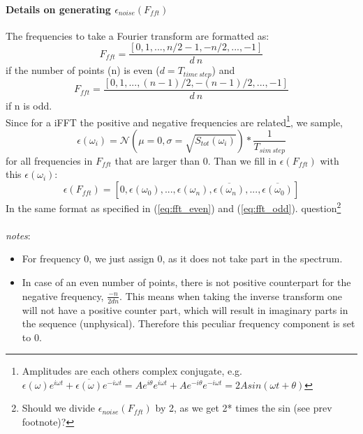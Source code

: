 \documentclass{paper}
\begin{document}
\paragraph{Details on generating $\epsilon_{noise}(F_{fft})$} %
\label{par:notes}
The frequencies to take a Fourier transform are formatted as:
\begin{equation}\label{eq:fft_even}
	F_{fft} = \frac{[0, 1, ...,   n/2-1,     -n/2, ..., -1]}{d \: n}
\end{equation}
if the number of points (n) is even ($d = T_{time\:step}$) and 
\begin{equation}\label{eq:fft_odd}
	F_{fft} = \frac{[0, 1, ..., (n-1)/2, -(n-1)/2, ..., -1]}{d \:n }
\end{equation}
if n is odd.\\
Since for a iFFT the positive and negative frequencies are related\footnote{Amplitudes are each others complex conjugate, e.g. $\epsilon(\omega) e^{i\omega t} +  \overline{\epsilon(\omega)}e^{-i\omega t} = Ae^{i\theta}e^{i\omega t} + Ae^{-i\theta}e^{-i\omega t} = 2A sin(\omega t + \theta)$}, we sample,
\begin{equation}
	\epsilon(\omega_i) = \mathcal{N}(\mu=0, \sigma=\sqrt{S_{tot}(\omega_i)})*\frac{1}{T_{sim\:step}}
\end{equation}
for all frequencies in $F_{fft}$ that are larger than 0. Than we fill in $\epsilon(F_{fft})$ with this $\epsilon(\omega_i)$:
\begin{equation}
	\epsilon(F_{fft}) = \left[0, \epsilon(\omega_0), ..., \epsilon(\omega_n), \overline{\epsilon(\omega_n)}, ..., \overline{\epsilon(\omega_0)}\right]
\end{equation}
In the same format as specified in (\ref{eq:fft_even}) and (\ref{eq:fft_odd}). \color{blue}question\footnote{\color{blue} Should we divide $\epsilon_{noise}(F_{fft})$ by 2, as we get 2* times the sin (see prev footnote)?}\color{black}\\ \\
\textit{notes}:
\begin{itemize}
	\item For frequency 0, we just assign 0, as it does not take part in the spectrum.
	\item In case of an even number of points, there is not positive counterpart for the negative frequency, $\frac{-n}{2dn}$. This means when taking the inverse transform one will not have a positive counter part, which will result in imaginary parts in the sequence (unphysical). Therefore this peculiar frequency component is set to 0.
\end{itemize}

\end{document}
